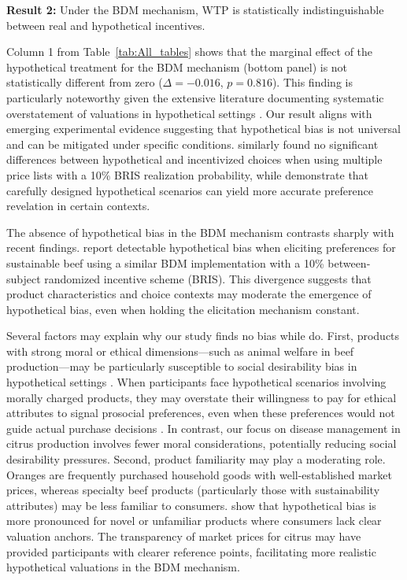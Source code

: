 \documentclass[12pt]{article}
\begin{document}
\vspace{0.5cm}

\textbf{Result 2:} Under the BDM mechanism, WTP is statistically indistinguishable between real and hypothetical incentives.

Column 1 from Table~\ref{tab:All_tables} shows that the marginal effect of the hypothetical treatment for the BDM mechanism (bottom panel) is not statistically different from zero (\(\Delta = -0.016\), \(p =0.816\)). This finding is particularly noteworthy given the extensive literature documenting systematic overstatement of valuations in hypothetical settings \citep{penn2018understanding, loomis_whats_2011}.
Our result aligns with emerging experimental evidence suggesting that hypothetical bias is not universal and can be mitigated under specific conditions. \citet{branas-garza_paid_2023} similarly found no significant differences between hypothetical and incentivized choices when using multiple price lists with a 10\% BRIS realization probability, while \citet{drichoutis_incentives_2025} demonstrate that carefully designed hypothetical scenarios can yield more accurate preference revelation in certain contexts.


The absence of hypothetical bias in the BDM mechanism contrasts sharply with recent findings. \citet{ahles_testing_2024} report detectable hypothetical bias when eliciting preferences for sustainable beef using a similar BDM implementation with a 10\% between-subject randomized incentive scheme (BRIS). This divergence suggests that product characteristics and choice contexts may moderate the emergence of hypothetical bias, even when holding the elicitation mechanism constant. 

Several factors may explain why our study finds no bias while \citet{ahles_testing_2024} do. First, products with strong moral or ethical dimensions---such as animal welfare in beef production---may be particularly susceptible to social desirability bias in hypothetical settings \citep{bursztyn2025social, norwood2011social}. When participants face hypothetical scenarios involving morally charged products, they may overstate their willingness to pay for ethical attributes to signal prosocial preferences, even when these preferences would not guide actual purchase decisions \citep{carlsson2010design}. In contrast, our focus on disease management in citrus production involves fewer moral considerations, potentially reducing social desirability pressures.
Second, product familiarity may play a moderating role. Oranges are frequently purchased household goods with well-established market prices, whereas specialty beef products (particularly those with sustainability attributes) may be less familiar to consumers. \citet{veettil_hypothetical_2024} show that hypothetical bias is more pronounced for novel or unfamiliar products where consumers lack clear valuation anchors. The transparency of market prices for citrus may have provided participants with clearer reference points, facilitating more realistic hypothetical valuations in the BDM mechanism.
\end{document}

